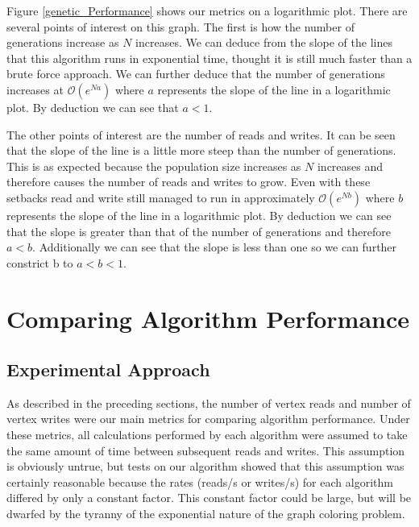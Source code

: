 \documentclass{article}
\begin{document}
	Figure \ref{genetic_Performance} shows our metrics on a logarithmic plot. There are several points of interest on this graph. The first is how the number of generations increase as $N$ increases. We can deduce from the slope of the lines that this algorithm runs in exponential time, thought it is still much faster than a brute force approach. We can further deduce that the number of generations increases at $\mathcal{O} (e^{Na})$ where $a$ represents the slope of the line in a logarithmic plot. By deduction we can see that  $a<1$.
	
	The other points of interest are the number of reads and writes. It can be seen that the slope of the line is a little more steep than the number of generations. This is as expected because the population size increases as $N$ increases and therefore causes the number of reads and writes to grow. Even with these setbacks read and write still managed to run in approximately  $\mathcal{O} (e^{Nb})$ where $b$ represents the slope of the line in a logarithmic plot. By deduction we can see that the slope is greater than that of the number of generations and therefore $a<b$. Additionally we can see that the slope is less than one so we can further constrict b to $a<b<1$. 
\section{Comparing Algorithm Performance}
	\label{comparisons}
	
	\subsection{Experimental Approach}
	
	As described in the preceding sections, the number of vertex reads and number of vertex writes were our main metrics for comparing algorithm performance. Under these metrics, all calculations performed by each algorithm were assumed to take the same amount of time between subsequent reads and writes. This assumption is obviously untrue, but tests on our algorithm showed that this assumption was certainly reasonable because the rates (reads/s or writes/s) for each algorithm differed by only a constant factor. This constant factor could be large, but will be dwarfed by the tyranny of the exponential nature of the graph coloring problem.
	
\end{document}
